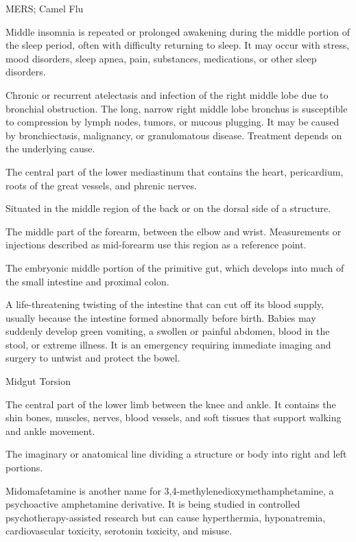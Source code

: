 \synonyms
MERS; Camel Flu

 Middle insomnia is repeated or prolonged awakening during the middle portion of the sleep period, often with difficulty returning to sleep. It may occur with stress, mood disorders, sleep apnea, pain, substances, medications, or other sleep disorders.

 Chronic or recurrent atelectasis and infection of the right middle lobe due to bronchial
obstruction. The long, narrow right middle lobe bronchus is susceptible to compression
by lymph nodes, tumors, or mucous plugging. It may be caused by bronchiectasis,
malignancy, or granulomatous disease. Treatment depends on the underlying cause.

 The central part of the lower mediastinum that contains the heart, pericardium, roots of the great vessels, and phrenic nerves.

 Situated in the middle region of the back or on the dorsal side of a structure.

 The middle part of the forearm, between the elbow and wrist. Measurements or injections described as mid-forearm use this region as a reference point.

 The embryonic middle portion of the primitive gut, which develops into much of the small intestine and proximal colon.

 A life-threatening twisting of the intestine that can cut off its blood supply, usually because the intestine formed abnormally before birth. Babies may suddenly develop green vomiting, a swollen or painful abdomen, blood in the stool, or extreme illness. It is an emergency requiring immediate imaging and surgery to untwist and protect the bowel.

\synonyms
Midgut Torsion

 The central part of the lower limb between the knee and ankle. It contains the shin bones, muscles, nerves, blood vessels, and soft tissues that support walking and ankle movement.

 The imaginary or anatomical line dividing a structure or body into right and left portions.

 Midomafetamine is another name for 3,4-methylenedioxymethamphetamine, a psychoactive amphetamine derivative. It is being studied in controlled psychotherapy-assisted research but can cause hyperthermia, hyponatremia, cardiovascular toxicity, serotonin toxicity, and misuse.


